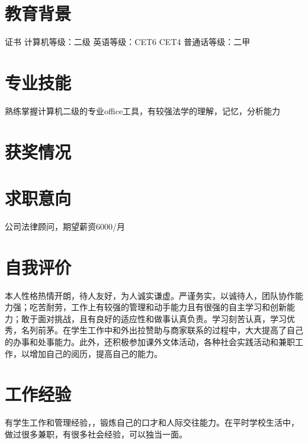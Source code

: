 \documentclass{uniquecv}
\begin{document}

\medskip



\section{教育背景}
证书 \quad 计算机等级：二级 \quad 英语等级：CET6 CET4 \quad 普通话等级：二甲 



\section{专业技能}
\smallskip
熟练掌握计算机二级的专业office工具，有较强法学的理解，记忆，分析能力


\section{获奖情况}

\medskip

\section{求职意向}
公司法律顾问，期望薪资6000/月
\section{自我评价}
本人性格热情开朗，待人友好，为人诚实谦虚。严谨务实，以诚待人，团队协作能力强；吃苦耐劳，工作上有较强的管理和动手能力且有很强的自主学习和创新能力；敢于面对挑战，且有良好的适应性和做事认真负责。学习刻苦认真，学习优秀，名列前茅。在学生工作中和外出拉赞助与商家联系的过程中，大大提高了自己的办事和处事能力。此外，还积极参加课外文体活动，各种社会实践活动和兼职工作，以增加自己的阅历，提高自己的能力。
\section{工作经验}
有学生工作和管理经验，，锻炼自己的口才和人际交往能力。在平时学校生活中，做过很多兼职，有很多社会经验，可以独当一面。
\end{document}
